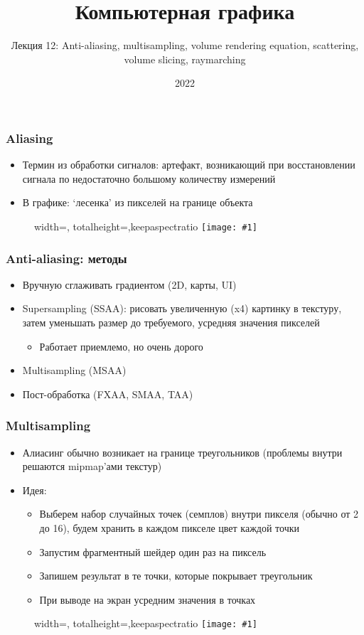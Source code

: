 \documentclass{beamer}
\title{Компьютерная графика}
\subtitle{Лекция 12: Anti-aliasing, multisampling, volume rendering equation, scattering, volume slicing, raymarching}
\date{2022}
\newcommand{\slideimage}[1]{
  \begin{figure}
    \begin{adjustbox}{width=\textwidth, totalheight=\textheight-2\baselineskip-2\baselineskip,keepaspectratio}
      \texttt{[image: \#1]}
    \end{adjustbox}
  \end{figure}
}
\begin{document}
\frame{\titlepage}
\begin{frame}[fragile]
\frametitle{Aliasing}
\begin{itemize}
\item Термин из обработки сигналов: артефакт, возникающий при восстановлении сигнала по недостаточно большому количеству измерений
\pause
\item В графике: `лесенка' из пикселей на границе объекта
\end{itemize}
\slideimage{aliasing.png}
\end{frame}

\begin{frame}[fragile]
\frametitle{Anti-aliasing: методы}
\begin{itemize}
\item Вручную сглаживать градиентом (2D, карты, UI)
\pause
\item Supersampling (SSAA): рисовать увеличенную (x4) картинку в текстуру, затем уменьшать размер до требуемого, усредняя значения пикселей
\begin{itemize}
\item Работает приемлемо, но очень дорого
\end{itemize}
\pause
\item Multisampling (MSAA)
\pause
\item Пост-обработка (FXAA, SMAA, TAA)
\end{itemize}
\end{frame}

\begin{frame}[fragile]
\frametitle{Multisampling}
\begin{itemize}
\item Алиасинг обычно возникает на границе треугольников (проблемы внутри решаются mipmap'ами текстур)
\pause
\item Идея:
\begin{itemize}
\item Выберем набор случайных точек (семплов) внутри пикселя (обычно от 2 до 16), будем хранить в каждом пикселе цвет каждой точки
\item Запустим фрагментный шейдер один раз на пиксель
\item Запишем результат в те точки, которые покрывает треугольник
\item При выводе на экран усредним значения в точках
\end{itemize}
\end{itemize}
\slideimage{multisampling.png}
\end{frame}
\end{document}
